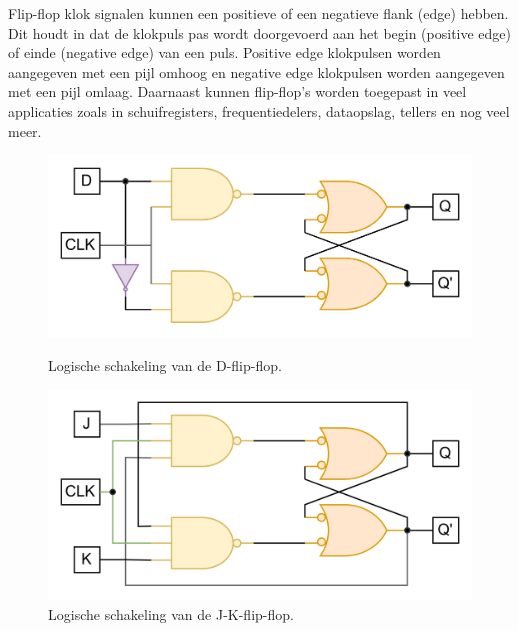 \documentclass[12pt]{article}
\begin{document}
Flip-flop klok signalen kunnen een positieve of een negatieve flank (edge) hebben. Dit houdt in dat de klokpuls pas wordt doorgevoerd aan het begin (positive edge) of einde (negative edge) van een puls. 
Positive edge klokpulsen worden aangegeven met een pijl omhoog en negative edge klokpulsen worden aangegeven met een pijl omlaag. 
Daarnaast kunnen flip-flop's worden toegepast in veel applicaties zoals in schuifregisters, frequentiedelers, dataopslag, tellers en nog veel meer. 
\begin{figure}[h]
    \centering
    \begin{minipage}{.5\textwidth}
      \centering
      \includegraphics[width=1\linewidth]{dflip.png}
      \caption{Logische schakeling van de D-flip-flop.}
      \label{fig:dflipflop}
    \end{minipage}%
    \begin{minipage}{.5\textwidth}
      \centering
      \includegraphics[width=1\linewidth]{jkflip.png}
      \caption{Logische schakeling van de J-K-flip-flop.}
      \label{fig:tessat2}
    \end{minipage}
    \end{figure}
\pagebreak
\end{document}
